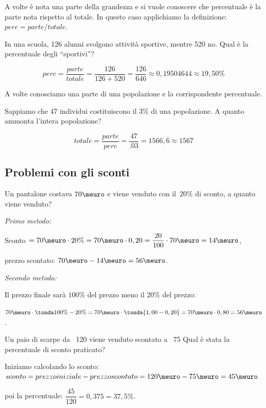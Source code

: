A volte è nota una parte della grandezza e si vuole conoscere che 
percentuale è la parte nota rispetto al totale. 
In questo caso applichiamo la definizione: \(perc = parte/totale\).

\begin{esempio}{}{}
In una scuola, 126 alunni svolgono attività sportive, mentre 520 no.
Qual è la percentuale degli ``sportivi''?

\vspace{-.5em}
\[perc = \frac{parte}{totale} =
\frac{126}{126+520} = \frac{126}{646} \approx 0,19504644 \approx 19,50\%\]
\end{esempio}

A volte conosciamo una parte di una popolazione e la corrispondente 
percentuale.

\begin{esempio}{}{}
Sappiamo che 47 individui costituiscono il 3\% di una popolazione. 
A quanto ammonta l'intera popolazione?

\vspace{-.5em}
\[totale = \frac{parte}{perc} = \frac{47}{.03} = 1566,\overline 6 
\approx 1567\]
\end{esempio}

\subsection{Problemi con gli sconti}

\begin{esempio}{}{}
Un pantalone costava \(70\meuro\) e viene venduto con il~\(20\%\) di 
sconto, a quanto viene venduto?

\vspace{.5em}
\emph{Primo metodo:} 

Sconto 
\(= 70\meuro \cdot 20\% = 
  70\meuro \cdot 0,20 = 
  \dfrac{20}{100}\cdot70\meuro = 14\meuro\), \qquad 
  
prezzo scontato: 
\(70\meuro -14\meuro = 
56\meuro\).

\vspace{.5em}
\emph{Secondo metodo:} 

Il prezzo finale sarà \(100\%\) del prezzo meno il \(20\%\) del prezzo:

\(70\meuro \cdot \tonda{100\% - 20\%} = 
70\meuro \cdot \tonda{1,00 - 0,20} = 
70\meuro \cdot 0,80 = 56\meuro\).
\end{esempio}

 \begin{esempio}{}{}
Un paio di scarpe da \meuro\ 120 viene venduto scontato a 
\meuro\ 75 Qual è stata la percentuale di sconto praticato?

Iniziamo calcolando lo sconto: \\
\(sconto = prezzo iniziale - prezzo scontato = 
  120\meuro - 75\meuro = 45 \meuro\)

poi la percentuale: \qquad 
\(\dfrac{45}{120}=0,375 =37,5\%\).
 \end{esempio}

